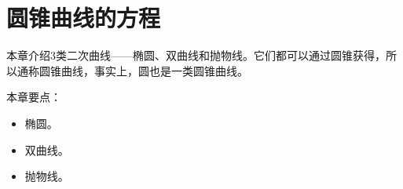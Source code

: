 \chapter{圆锥曲线的方程}

本章介绍3类二次曲线——椭圆、双曲线和抛物线。它们都可以通过圆锥获得，所以通称圆锥曲线，事实上，圆也是一类圆锥曲线。

本章要点：
\begin{itemize}
    \item 椭圆。
    \item 双曲线。
    \item 抛物线。
\end{itemize}

\newpage


\newpage


\newpage


\newpage





